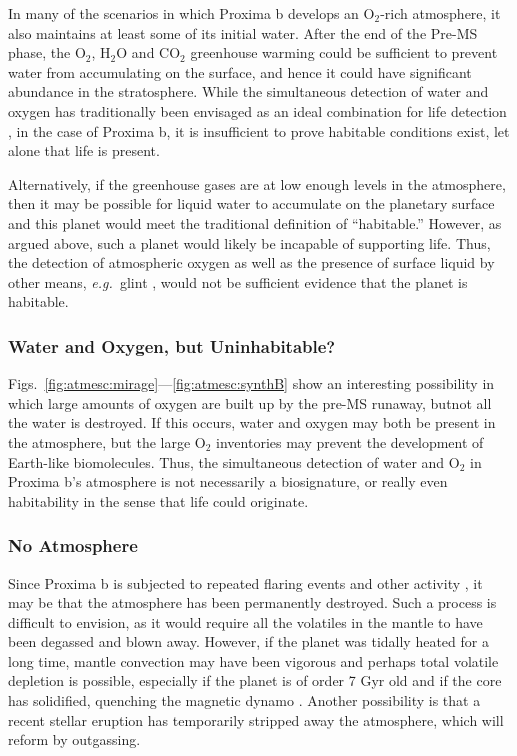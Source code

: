 \documentclass[preprint,12pt]{aastex}
\def\eg{{\it e.g.\ }}
\begin{document}
In many of the scenarios in which Proxima b develops an O$_2$-rich
atmosphere, it also maintains at least some of its initial water.
After the end of the Pre-MS phase, the O$_2$, H$_2$O and CO$_2$
greenhouse warming could be sufficient to prevent water from
accumulating on the surface, and hence it could have significant
abundance in the stratosphere. While the simultaneous detection of
water and oxygen has traditionally been envisaged as an ideal
combination for life detection \citep{DesMarais2002}, in the case of
Proxima b, it is insufficient to prove habitable conditions exist, let
alone that life is present.

Alternatively, if the greenhouse gases are at low enough levels in the
atmosphere, then it may be possible for liquid water to accumulate on
the planetary surface and this planet would meet the traditional
definition of ``habitable.'' However, as argued above, such a planet
would likely be incapable of supporting life.  Thus, the detection of
atmospheric oxygen as well as the presence of surface liquid by other
means, \eg glint \citep{Robinson10}, would not be sufficient evidence
that the planet is habitable.

\subsubsection{Water and Oxygen, but Uninhabitable?}

Figs.~\ref{fig:atmesc:mirage}---\ref{fig:atmesc:synthB} show an
interesting possibility in which large amounts of oxygen are built up
by the pre-MS runaway, butnot all the water is destroyed. If this
occurs, water and oxygen may both be present in the atmosphere, but
the large O$_2$ inventories may prevent the development of Earth-like
biomolecules. Thus, the simultaneous detection of water and O$_2$ in
Proxima b's atmosphere is not necessarily a biosignature, or really
even habitability in the sense that life could originate.

\subsubsection{No Atmosphere}
\label{sec:results:atmstates:noatmos}

Since Proxima b is subjected to repeated flaring events and other
activity \citep{Walker81,Davenport16}, it may be that the atmosphere
has been permanently destroyed. Such a process is difficult to
envision, as it would require all the volatiles in the mantle to have
been degassed and blown away. However, if the planet was tidally
heated for a long time, mantle convection may have been vigorous and
perhaps total volatile depletion is possible, especially if the planet
is of order 7 Gyr old and if the core has solidified, quenching the
magnetic dynamo \citep{DriscollBarnes15}. Another possibility is that
a recent stellar eruption has temporarily stripped away the
atmosphere, which will reform by outgassing.
\end{document}
